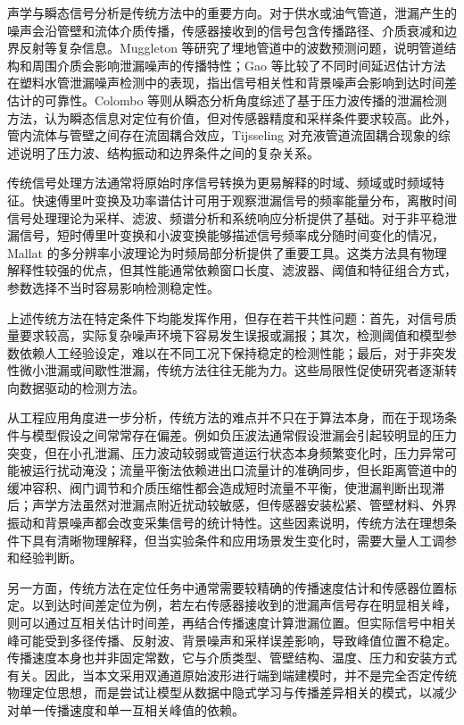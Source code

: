 声学与瞬态信号分析是传统方法中的重要方向。对于供水或油气管道，泄漏产生的噪声会沿管壁和流体介质传播，传感器接收到的信号包含传播路径、介质衰减和边界反射等复杂信息。Muggleton 等研究了埋地管道中的波数预测问题，说明管道结构和周围介质会影响泄漏噪声的传播特性\cite{cody2004acoustic}；Gao 等比较了不同时间延迟估计方法在塑料水管泄漏噪声检测中的表现，指出信号相关性和背景噪声会影响到达时间差估计的可靠性\cite{gao2005leak}。Colombo 等则从瞬态分析角度综述了基于压力波传播的泄漏检测方法，认为瞬态信息对定位有价值，但对传感器精度和采样条件要求较高\cite{colombo2009transient}。此外，管内流体与管壁之间存在流固耦合效应，Tijsseling 对充液管道流固耦合现象的综述说明了压力波、结构振动和边界条件之间的复杂关系\cite{tijsseling1996fluid}。

传统信号处理方法通常将原始时序信号转换为更易解释的时域、频域或时频域特征。快速傅里叶变换及功率谱估计可用于观察泄漏信号的频率能量分布\cite{cooley1965fft,welch1967psd}，离散时间信号处理理论为采样、滤波、频谱分析和系统响应分析提供了基础\cite{oppenheim2010dsp}。对于非平稳泄漏信号，短时傅里叶变换和小波变换能够描述信号频率成分随时间变化的情况，Mallat 的多分辨率小波理论为时频局部分析提供了重要工具\cite{mallat1989wavelet}。这类方法具有物理解释性较强的优点，但其性能通常依赖窗口长度、滤波器、阈值和特征组合方式，参数选择不当时容易影响检测稳定性。

上述传统方法在特定条件下均能发挥作用，但存在若干共性问题：首先，对信号质量要求较高，实际复杂噪声环境下容易发生误报或漏报；其次，检测阈值和模型参数依赖人工经验设定，难以在不同工况下保持稳定的检测性能；最后，对于非突发性微小泄漏或间歇性泄漏，传统方法往往无能为力\cite{kiymik2005FT}。这些局限性促使研究者逐渐转向数据驱动的检测方法。

从工程应用角度进一步分析，传统方法的难点并不只在于算法本身，而在于现场条件与模型假设之间常常存在偏差。例如负压波法通常假设泄漏会引起较明显的压力突变，但在小孔泄漏、压力波动较弱或管道运行状态本身频繁变化时，压力异常可能被运行扰动淹没；流量平衡法依赖进出口流量计的准确同步，但长距离管道中的缓冲容积、阀门调节和介质压缩性都会造成短时流量不平衡，使泄漏判断出现滞后；声学方法虽然对泄漏点附近扰动较敏感，但传感器安装松紧、管壁材料、外界振动和背景噪声都会改变采集信号的统计特性。这些因素说明，传统方法在理想条件下具有清晰物理解释，但当实验条件和应用场景发生变化时，需要大量人工调参和经验判断。

另一方面，传统方法在定位任务中通常需要较精确的传播速度估计和传感器位置标定。以到达时间差定位为例，若左右传感器接收到的泄漏声信号存在明显相关峰，则可以通过互相关估计时间差，再结合传播速度计算泄漏位置。但实际信号中相关峰可能受到多径传播、反射波、背景噪声和采样误差影响，导致峰值位置不稳定。传播速度本身也并非固定常数，它与介质类型、管壁结构、温度、压力和安装方式有关。因此，当本文采用双通道原始波形进行端到端建模时，并不是完全否定传统物理定位思想，而是尝试让模型从数据中隐式学习与传播差异相关的模式，以减少对单一传播速度和单一互相关峰值的依赖。


